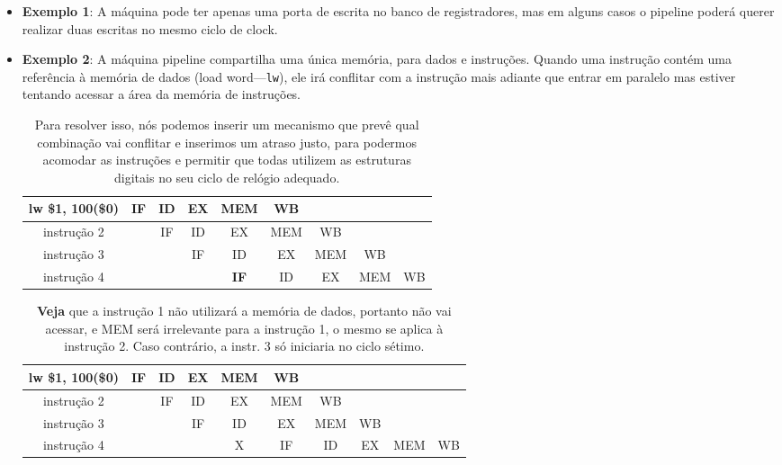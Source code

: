 \documentclass{article}
\begin{document}
\begin{enumerate}
\begin{itemize}
\item \textbf{Exemplo 1}: A máquina pode ter apenas uma porta de escrita no 
banco de registradores, mas em alguns casos o pipeline poderá querer realizar 
duas escritas no mesmo ciclo de clock.

\item \textbf{Exemplo 2}: A máquina pipeline compartilha uma única memória, 
para dados e instruções. Quando uma instrução contém uma referência à memória 
de dados (load word---\verb|lw|), ele irá conflitar com a instrução mais 
adiante que entrar em paralelo mas estiver tentando acessar a área da memória 
de instruções.

\begin{table}[ht!]
  \centering
  \begin{tabular}{|c|c|c|c|c|c|c|c|c|}
    \hline lw \$1, 100(\$0) & IF & ID & EX  & {\color{Red} \textbf{MEM}}
                            & WB &    &     & \\
    \hline instrução 2      &    & IF & ID  & EX  & MEM & WB    &     & \\
    \hline instrução 3      &    &    & IF  & ID  & EX  & MEM   & WB  & \\
    \hline instrução 4      &    &    &     & {\color{Red} \textbf{IF}}
                            & ID & EX & MEM & WB \\
    \hline
  \end{tabular}
  \caption{Para resolver isso, nós podemos inserir um mecanismo que prevê qual
  combinação vai conflitar e inserimos um atraso justo, para podermos acomodar
  as instruções e permitir que todas utilizem as estruturas digitais no seu
  ciclo de relógio adequado.}
\end{table}

\begin{table}[ht!]
  \centering
  \begin{tabular}{|c|c|c|c|c|c|c|c|c|c|}
    \hline lw \$1, 100(\$0) & IF& ID& EX& MEM& WB &    &   &    &    \\
    \hline instrução 2      &   & IF& ID& EX & MEM& WB &   &    &    \\
    \hline instrução 3      &   &   & IF& ID & EX & MEM& WB&    &    \\
    \hline instrução 4      &   &   &   &  X & IF & ID & EX& MEM& WB \\
    \hline
  \end{tabular}
  \caption{\textbf{Veja} que a instrução 1 não utilizará a memória de dados,
  portanto não vai acessar, e MEM será irrelevante para a instrução 1, o mesmo
  se aplica à instrução 2. Caso contrário, a instr. 3 só iniciaria no ciclo
  sétimo.}
\end{table}


\end{itemize}
\end{enumerate}
\end{document}
